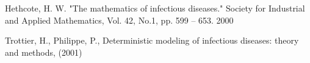 \begin{thebibliography}{99}

Hethcote, H. W. "The mathematics of infectious diseases." Society for Industrial and Applied Mathematics, Vol. 42, No.1, pp. 599 – 653. 2000

Trottier, H., Philippe, P., Deterministic modeling of infectious diseases: theory and methods, (2001)

\end{thebibliography}


